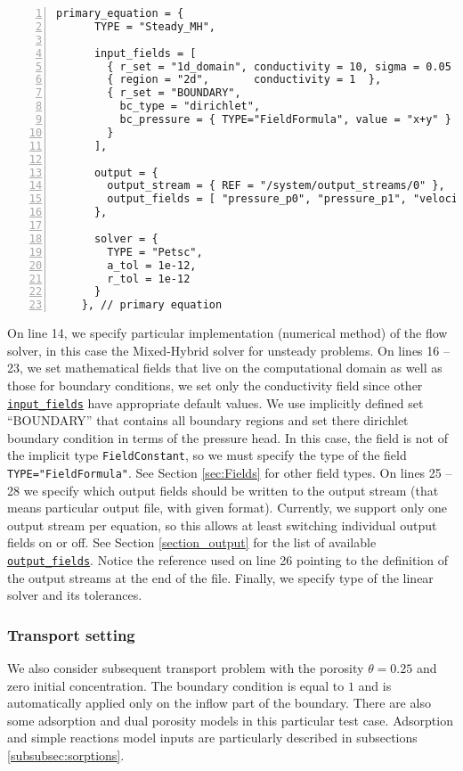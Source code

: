 \documentclass[12pt,a4paper]{report}
\begin{document}
\begin{Verbatim}[numbers=left, firstnumber=last]
    primary_equation = {
      TYPE = "Steady_MH", 

      input_fields = [
        { r_set = "1d_domain", conductivity = 10, sigma = 0.05 },
        { region = "2d",       conductivity = 1  },
        { r_set = "BOUNDARY",
          bc_type = "dirichlet",
          bc_pressure = { TYPE="FieldFormula", value = "x+y" }
        }
      ],

      output = {
        output_stream = { REF = "/system/output_streams/0" }, 
        output_fields = [ "pressure_p0", "pressure_p1", "velocity_p0" ]
      }, 
      
      solver = {
        TYPE = "Petsc",
        a_tol = 1e-12,
        r_tol = 1e-12
      }
    }, // primary equation
\end{Verbatim}
On line 14, we specify particular implementation (numerical method) of the flow solver, in this case the Mixed-Hybrid
solver for unsteady problems. On lines 16 -- 23, we set mathematical fields that live on the computational domain as well as those for boundary conditions, we set only the conductivity field since other \hyperlink{IT::DarcyFlowMH-Data}{\tt input\_fields} have appropriate default values.
We use implicitly defined set ``BOUNDARY'' that contains all boundary regions and set there dirichlet boundary condition in terms of the 
pressure head. In this case, the field is not of the implicit type {\tt FieldConstant}, so we must specify the type of the field {\tt TYPE="FieldFormula"}.
See Section \ref{sec:Fields} for other field types. 
On lines 25 -- 28 we specify which output fields should be written to the output stream (that means particular output file, with given format).
Currently, we support only one output stream per equation, so this allows at least switching individual output fields on or off. 
See Section \ref{section_output} for the list of available \hyperlink{DarcyMHOutput::output-fields::B}{\tt output\_fields}.
Notice the reference used on line 26 pointing to the definition of the output streams at the end of the file. Finally, we specify type of the linear solver and its tolerances.



\subsubsection{Transport setting}
We also consider subsequent transport problem with the porosity $\theta = 0.25$ and zero initial concentration. The boundary condition is equal to $1$ and is automatically applied only on the 
inflow part of the boundary. There are also some adsorption and dual porosity models in this particular test case. Adsorption and simple reactions model inputs are particularly described in subsections \ref{subsubsec:sorptions}.%
\end{document}
